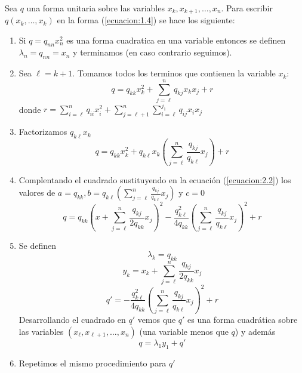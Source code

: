 \paragraph{}
Sea $q$ una forma unitaria sobre las variables $x_{k}, x_{k+1}, \ldots, x_{n}$. Para escribir $q\left(x_{k},\ldots,x_{k}\right)$ en la forma (\ref{ecuacion:1.4}) se hace los siguiente:

\begin{enumerate}
\item Si $q = q_{nn}x_{n}^{2}$ es una forma cuadratica en una variable entonces se definen $\lambda_{n} = q_{nn} = x_{n}$ y terminamos (en caso contrario seguimos).
\item Sea $\ell = k + 1$. Tomamos todos los terminos que contienen la variable $x_{k}$:
\begin{equation*}
q = q_{kk}x_{k}^{2} + \sum_{j=\ell}^{n}q_{kj}x_{k}x_{j} + r
\end{equation*}
donde $r = \sum_{i=\ell}^{n}q_{ii}x_{i}^{2} + \sum_{j=\ell+1}^{n}\sum_{i=\ell}^{j_1} q_{ij}x_{i}x_{j}$
\item Factorizamos $q_{k\ell}x_{k}$
 \begin{equation*}
q = q_{kk}x_{k}^{2} + q_{k\ell}x_{k}\left(\sum_{j=\ell}^{n}\frac{q_{kj}}{q_{k\ell}}x_{j}\right) + r
\end{equation*}
\item Complentando el cuadrado sustituyendo en la ecuación (\ref{ecuacion:2.2}) los valores de $a = q_{kk}, b= q_{k\ell}\left(\sum_{j=\ell}^{n}\frac{q_{kj}}{q_{k\ell}}x_{j}\right)$ y $c=0$
\begin{equation*}
q = q_{kk}\left(x + \sum_{j=\ell}^{n}\frac{q_{kj}}{2q_{kk}}x_{j}\right)^{2} - \frac{q_{k\ell}^{2}}{4q_{kk}}\left(\sum_{j=\ell}^{n}\frac{q_{kj}}{q_{k\ell}}x_{j}\right)^{2} + r
\end{equation*}
\item Se definen
\begin{equation*}
\lambda_{k} = q_{kk}
\end{equation*}
\begin{equation*}
y_{k} = x_{k} + \sum_{j=\ell}^{n}\frac{q_{kj}}{2q_{kk}}x_{j}
\end{equation*}
\begin{equation*}
q' = -\frac{q_{k\ell}^{2}}{4q_{kk}}\left(\sum_{j=\ell}^{n}\frac{q_{kj}}{q_{k\ell}}x_{j}\right)^{2} + r
\end{equation*}
Desarrollando el cuadrado en $q'$ vemos que $q'$ es una forma cuadrática sobre las variables $\left(x_{\ell},x_{\ell+1},\ldots,x_{n}\right)$ (una variable menos que $q$) y además 
\begin{equation*}
q = \lambda_{1}y_{1} + q'
\end{equation*}
\item Repetimos el mismo procedimiento para $q'$
\end{enumerate}

